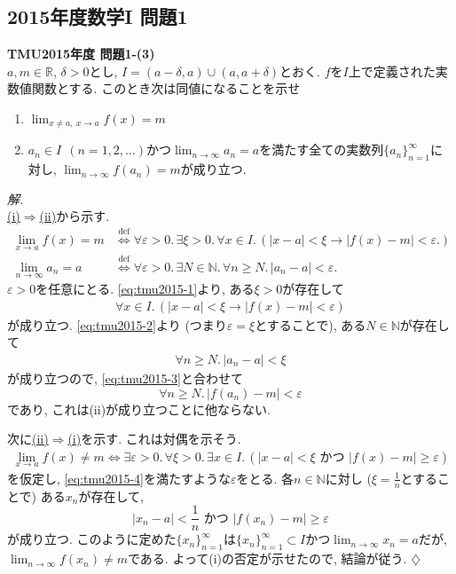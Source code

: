 \documentclass[titlepage]{jsarticle}
\numberwithin{equation}{section}
\newcommand{\N}{\mathbb{N}}%
\newcommand{\R}{\mathbb{R}}%
\newenvironment{kaitou}[1][解]{%
\begin{proofbox}%
\textit{#1. }\ignorespaces
}{%
\hfill$\diamondsuit$%
\end{proofbox}%
}
\begin{document}
\subsection{2015年度数学I 問題1}
\begin{problem}
\textbf{TMU2015年度 問題1-(3)}\\
$a, m\in \R$, $\delta>0$とし, $I = (a - \delta, a) \cup (a, a+\delta)$とおく. $f$を$I$上で定義された実数値関数とする. このとき次は同値になることを示せ
\begin{enumerate}
\item[(i)] $\displaystyle{\lim_{x \ne a, \:x \to a}}f(x) = m$
\item[(ii)] $a_n \in I\:\:(n=1,2, \ldots)$かつ$\displaystyle{\lim_{n \to \infty}} a_n = a$を満たす全ての実数列$\{a_n\}_{n = 1}^{\infty}$に対し, $\displaystyle{\lim_{n \to \infty} f(a_n)} = m$が成り立つ.
\end{enumerate}
\end{problem}
\begin{kaitou}\\
\uline{(i)$\Rightarrow$(ii)}から示す.
\begin{align}
\lim_{x \to a} f(x) = m &\stackrel{\mathrm{def}}{\iff} \forall \varepsilon>0.\, \exists \xi>0.\, \forall x \in I.\, \left(|x-a|< \xi \to |f(x) - m| < \varepsilon.\right) \label{eq:tmu2015-1}\\
\lim_{n \to \infty} a_n = a &\stackrel{\mathrm{def}}{\iff} \forall \varepsilon>0.\, \exists N\in\N.\, \forall n \ge N.\, |a_n - a| < \varepsilon.  \label{eq:tmu2015-2}
\end{align}
$\varepsilon > 0$を任意にとる. \eqref{eq:tmu2015-1}より, ある$\xi > 0$が存在して
\begin{align}
\forall x \in I.\,\left(|x - a| < \xi \to |f(x) - m| < \varepsilon \right) \label{eq:tmu2015-3}
\end{align}
が成り立つ. \eqref{eq:tmu2015-2}より (つまり$\varepsilon = \xi$とすることで), ある$N \in \N$が存在して
\begin{align*}
\forall n \ge N.\, |a_n - a| < \xi
\end{align*}
が成り立つので, \eqref{eq:tmu2015-3}と合わせて
\[
\forall n \ge N.\, |f(a_n) - m| < \varepsilon
\]
であり, これは(ii)が成り立つことに他ならない.

次に\uline{(ii)$\Rightarrow$(i)}を示す. これは対偶を示そう. 
\begin{align}
\lim_{x \to a} f(x) \ne m \iff \exists \varepsilon > 0.\,\forall \xi > 0.\, \exists x \in I.\,\left(|x - a| < \xi\,\,\text{かつ}\,\,|f(x) - m| \ge \varepsilon \right) \label{eq:tmu2015-4}
\end{align}
を仮定し, \eqref{eq:tmu2015-4}を満たすような$\varepsilon$をとる. 各$n \in \N$に対し ($\xi = \frac{1}{n}$とすることで) ある$x_n$が存在して,
\[
|x_n - a|  < \frac{1}{n}\,\,\text{かつ}\,\,|f(x_n) - m| \ge \varepsilon
\]
が成り立つ. このように定めた$\{x_n\}_{n = 1}^\infty$は$\{x_n\}_{n = 1}^\infty \subset I$かつ$\displaystyle{\lim_{n \to \infty} x_n} = a$だが, $\lim_{n \to \infty} f(x_n) \ne m$である. よって(i)の否定が示せたので, 結論が従う.
\end{kaitou}
\end{document}
